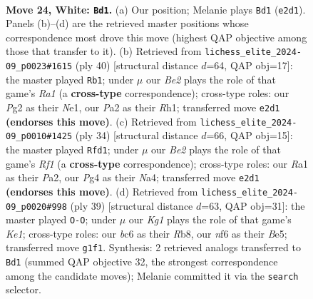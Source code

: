 \documentclass[11pt]{article}
\begin{document}
\clearpage

\begin{figure}[p]\centering
\begin{subfigure}{0.46\textwidth}\centering
\resizebox{\linewidth}{!}{%
\newchessgame
\chessboard[
  setfen={5rk1/4rppp/1nb1pn2/p1N5/6P1/1P2P3/P3BRPP/RN4K1 w - - 1 24},
  showmover=false,
  pgfstyle=straightmove, color=movearrow, markmove={e2-d1}
]}
\caption{}
\end{subfigure}\hfill
\begin{subfigure}{0.46\textwidth}\centering
\resizebox{\linewidth}{!}{%
\newchessgame
\chessboard[
  setfen={r3r1k1/1p3ppp/8/p2p3P/1n6/3P4/Pb1B1PP1/R3NK1R w - - 0 21},
  showmover=false,
  pgfstyle=straightmove, color=movearrow, markmove={a1-b1}
]}
\caption{}
\end{subfigure}
\\[4pt]
\begin{subfigure}{0.46\textwidth}\centering
\resizebox{\linewidth}{!}{%
\newchessgame
\chessboard[
  setfen={r1r3k1/p4ppp/3np3/3p4/N2N4/3bP3/PP3PPP/2R2RK1 w - - 1 18},
  showmover=false,
  pgfstyle=straightmove, color=movearrow, markmove={f1-d1}
]}
\caption{}
\end{subfigure}\hfill
\begin{subfigure}{0.46\textwidth}\centering
\resizebox{\linewidth}{!}{%
\newchessgame
\chessboard[
  setfen={1r2k2r/1p1n1ppp/1P6/P3b3/2Np4/2pP4/4PPBP/R3K2R b KQk - 0 20},
  showmover=false,
  pgfstyle=straightmove, color=movearrow, markmove={e8-g8}
]}
\caption{}
\end{subfigure}
\caption{\textbf{Move 24, White: \texttt{Bd1}.} (a) Our position; Melanie plays \texttt{Bd1} (\texttt{e2d1}). Panels (b)--(d) are the retrieved master positions whose correspondence most drove this move (highest QAP objective among those that transfer to it). (b) Retrieved from \texttt{lichess\_elite\_2024-09\_p0023\#1615} (ply 40) [structural distance $d$=64, QAP obj=17]: the master played \texttt{Rb1}; under $\mu$ our \emph{Be2} plays the role of that game's \emph{Ra1} (a \textbf{cross-type} correspondence); cross-type roles: our \emph{P}g2 as their \emph{N}e1, our \emph{P}a2 as their \emph{R}h1; transferred move \texttt{e2d1} \textbf{(endorses this move)}. (c) Retrieved from \texttt{lichess\_elite\_2024-09\_p0010\#1425} (ply 34) [structural distance $d$=66, QAP obj=15]: the master played \texttt{Rfd1}; under $\mu$ our \emph{Be2} plays the role of that game's \emph{Rf1} (a \textbf{cross-type} correspondence); cross-type roles: our \emph{R}a1 as their \emph{P}a2, our \emph{P}g4 as their \emph{N}a4; transferred move \texttt{e2d1} \textbf{(endorses this move)}. (d) Retrieved from \texttt{lichess\_elite\_2024-09\_p0020\#998} (ply 39) [structural distance $d$=63, QAP obj=31]: the master played \texttt{O-O}; under $\mu$ our \emph{Kg1} plays the role of that game's \emph{Ke1}; cross-type roles: our \emph{b}c6 as their \emph{R}b8, our \emph{n}f6 as their \emph{B}e5; transferred move \texttt{g1f1}. Synthesis: 2 retrieved analogs transferred to \texttt{Bd1} (summed QAP objective 32, the strongest correspondence among the candidate moves); Melanie committed it via the \texttt{search} selector.}
\label{fig:thought-m46}
\end{figure}
\end{document}
